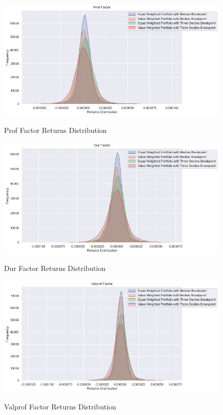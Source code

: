 \begin{figure}[H]
	\caption{Prof Factor Returns Distribution}
	\centering
	\includegraphics[scale=.63]{../../output/figures/prof.png}
	\label{fig:prof}
\end{figure}

\begin{figure}[H]
	\caption{Dur Factor Returns Distribution}
	\centering
	\includegraphics[scale=.63]{../../output/figures/dur.png}
	\label{fig:dur}
\end{figure}

\begin{figure}[H]
	\caption{Valprof Factor Returns Distribution}
	\centering
	\includegraphics[scale=.63]{../../output/figures/valprof.png}
	\label{fig:valprof}
\end{figure}

